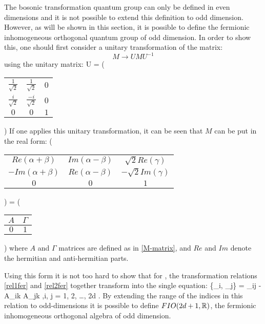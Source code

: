 The bosonic transformation quantum group \BISp can only be defined
in even dimensions and it is not possible to extend this definition
to odd dimension. However, as will be shown in this section, it is
possible to define the fermionic inhomogeneous orthogonal quantum
group of odd dimension. In order to show this, one should first
consider a unitary transformation of the \FIO matrix:
\[
M \rightarrow UMU^{-1}
\]
using the unitary matrix:
\beq U = \left(
\begin{tabular}{cc|c}
$\frac{1}{\sqrt{2}}$ & $\frac{1}{\sqrt{2}}$ & $0$ \\
$\frac{i}{\sqrt{2}}$ & $\frac{-i}{\sqrt{2}}$ & $0$ \\
\hline $0$ & $0$ & $1$
\end{tabular}
\right)
\eeq
If one applies this unitary transformation, it can be seen that
$M$ can be put in the real form:
\beq
\left(
\begin{tabular}{cc|c}
$Re(\alpha + \beta)$ & $Im(\alpha - \beta)$ & $\sqrt{2}Re(\gamma)$ \\
$-Im(\alpha + \beta)$ & $Re(\alpha - \beta)$ & $-\sqrt{2}Im(\gamma)$ \\
\hline $0$ & $0$ & $1$
\end{tabular}
\right) = \left(
\begin{tabular}{c|c}
$A$ & $\Gamma$ \\
\hline $0$ & $1$
\end{tabular}
\right)
\eeq
where $A$ and $\Gamma$ matrices are defined as in
\eqref{M-matrix}, and $Re$ and $Im$ denote the hermitian and
anti-hermitian parts.

Using this form it is not too hard to show that for \FIO,
the transformation relations \eqref{rel1fer} and \eqref{rel2fer}
together transform into the single equation:
\beq
\{\Gamma_i, \Gamma_j\} = \delta_{ij} - A_{ik} A_{jk} \quad,\quad i, j = 1, 2, \ldots , 2d .
\label{relcombined}
\eeq
By extending the range of the indices in this relation to
odd-dimensions it is possible
to define $FIO(2d + 1, \mathbb{R})$, the fermionic inhomogeneous
orthogonal algebra of odd dimension.

